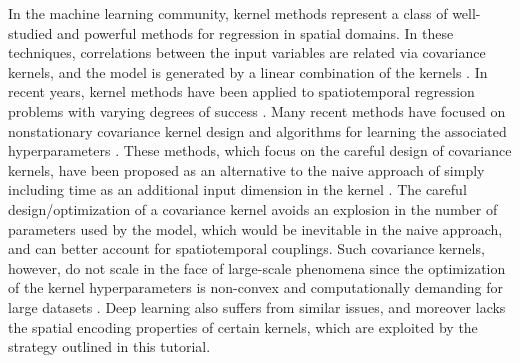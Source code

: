 In the machine learning community, kernel methods represent a class of well-studied and powerful methods for regression in spatial domains. In these techniques, correlations between the input variables are related via covariance kernels, and the model is generated by a linear combination of the kernels \cite{RasmussenWilliams2005,schoelkopf01kernelbased,scholkopf2002learning}. In recent years, kernel methods have been applied to spatiotemporal regression problems with varying degrees of success \cite{cressie2011statistics,RasmussenWilliams2005}. Many recent methods have focused on nonstationary covariance kernel design and algorithms for learning the associated hyperparameters \cite{garg2012AAAI,ma2003nonstationary,plagemann2008nonstationary,todescato2017efficient}. These methods, which focus on the careful design of covariance kernels, have been proposed as an alternative to the naive approach of simply including time as an additional input dimension in the kernel \cite{Chowdhary13_CDC1}. The careful design/optimization of a covariance kernel avoids an explosion in the number of parameters used by the model, which would be inevitable in the naive approach, and can better account for spatiotemporal couplings. Such covariance kernels, however, do not scale in the face of large-scale phenomena since the optimization of the kernel hyperparameters is non-convex and computationally demanding for large datasets \cite{sra2012optimization}. Deep learning also suffers from similar issues, and moreover lacks the spatial encoding properties of certain kernels, which are exploited by the strategy outlined in this tutorial.



